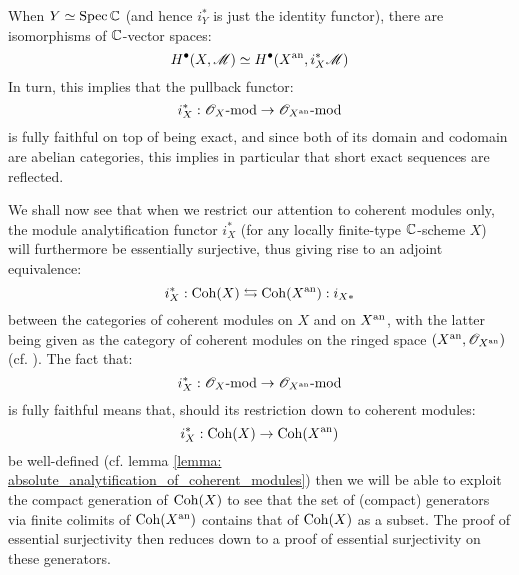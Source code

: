         \begin{corollary} \label{coro: GAGA_cohomological_comparison}
            When $Y \simeq \operatorname{Spec} \mathbb{C}$ (and hence $i_Y^*$ is just the identity functor), there are isomorphisms of $\mathbb{C}$-vector spaces:
                $$H^{\bullet}(X, \mathscr{M}) \simeq H^{\bullet}(X^{\mathrm{an}}, i_X^*\mathscr{M})$$
            In turn, this implies that the pullback functor:
                $$i_X^*: \mathscr{O}_X\text{-}\mathrm{mod} \to \mathscr{O}_{X^{\mathrm{an}}}\text{-}\mathrm{mod}$$
            is fully faithful on top of being exact, and since both of its domain and codomain are abelian categories, this implies in particular that short exact sequences are reflected. 
        \end{corollary}

        We shall now see that when we restrict our attention to coherent modules only, the module analytification functor $i_X^*$ (for any locally finite-type $\mathbb{C}$-scheme $X$) will furthermore be essentially surjective, thus giving rise to an adjoint equivalence:
            $$i_X^*: \mathrm{Coh}(X) \leftrightarrows \mathrm{Coh}(X^{\mathrm{an}}): i_{X *}$$
        between the categories of coherent modules on $X$ and on $X^{\mathrm{an}}$, with the latter being given as the category of coherent modules on the ringed space $(X^{\mathrm{an}}, \mathscr{O}_{X^{\mathrm{an}}})$ (cf. \cite[\href{https://stacks.math.columbia.edu/tag/01BU}{Tag 01BU}]{stacks}). The fact that:
            $$i_X^*: \mathscr{O}_X\text{-}\mathrm{mod} \to \mathscr{O}_{X^{\mathrm{an}}}\text{-}\mathrm{mod}$$
        is fully faithful means that, should its restriction down to coherent modules:
           $$i_X^*: \mathrm{Coh}(X) \to \mathrm{Coh}(X^{\mathrm{an}})$$
       be well-defined (cf. lemma \ref{lemma: absolute_analytification_of_coherent_modules}) then we will be able to exploit the compact generation of $\mathrm{Coh}(X)$ to see that the set of (compact) generators via finite colimits of $\mathrm{Coh}(X^{\mathrm{an}})$ contains that of $\mathrm{Coh}(X)$ as a subset. The proof of essential surjectivity then reduces down to a proof of essential surjectivity on these generators. 
